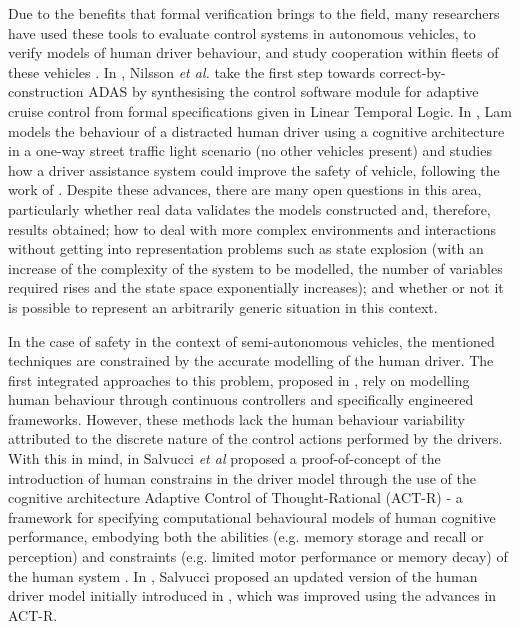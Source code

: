 Due to the benefits that formal verification brings to the field, many researchers have used these tools to evaluate control systems in autonomous vehicles, to verify models of human driver behaviour, and study cooperation within fleets of these vehicles \cite{games, fv2, fv3, fv1}. In \cite{nilsson}, Nilsson \textit{et al.} take the first step towards correct-by-construction ADAS by synthesising the control software module for adaptive cruise control from formal specifications given in Linear Temporal Logic. In \cite{lam}, Lam models the behaviour of a distracted human driver using a cognitive architecture in a one-way street traffic light scenario (no other vehicles present) and studies how a driver assistance system could improve the safety of vehicle, following the work of \cite{salvucci_1, curzon}. Despite these advances, there are many open questions in this area, particularly whether real data validates the models constructed and, therefore, results obtained; how to deal with more complex environments and interactions without getting into representation problems such as state explosion (with an increase of the complexity of the system to be modelled, the number of variables required rises and the state space exponentially increases); and whether or not it is possible to represent an arbitrarily generic situation in this context.

In the case of safety in the context of semi-autonomous vehicles, the mentioned techniques are constrained by the accurate modelling of the human driver. The first integrated approaches to this problem, proposed in \cite{boer, older_1, older_3}, rely on modelling human behaviour through continuous controllers and specifically engineered frameworks. However, these methods lack the human behaviour variability attributed to the discrete nature of the control actions performed by the drivers. With this in mind, in \cite{salvucci_0} Salvucci \textit{et al} proposed a proof-of-concept of the introduction of human constrains in the driver model through the use of the cognitive architecture Adaptive Control of Thought-Rational (ACT-R) - a framework for specifying computational behavioural models of human cognitive performance, embodying both the abilities (e.g. memory storage and recall or perception) and constraints (e.g. limited motor performance or memory decay) of the human system \cite{salvucci_1}. In \cite{salvucci_1}, Salvucci proposed an updated version of the human driver model initially introduced in \cite{salvucci_0}, which was improved using the advances in ACT-R.

